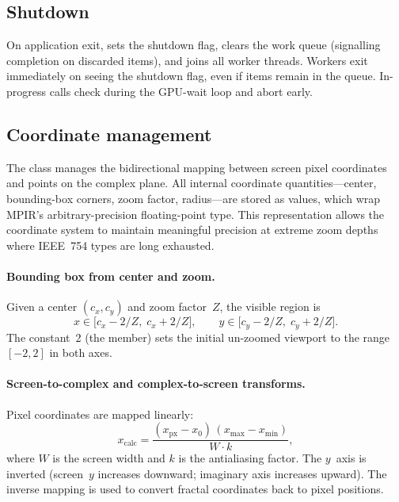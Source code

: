 \subsection{Shutdown}

On application exit,  sets the shutdown flag,
clears the work queue (signalling completion on discarded items), and joins all
worker threads.  Workers exit immediately on seeing the shutdown flag, even if
items remain in the queue.  In-progress  calls check
 during the GPU-wait loop and abort early.

\subsection{Coordinate management}
\label{subsec:coordinates}

The  class manages the bidirectional
mapping between screen pixel coordinates and points on the complex
plane.  All internal coordinate quantities---center, bounding-box
corners, zoom factor, radius---are stored as 
values, which wrap MPIR's  arbitrary-precision
floating-point type.  This representation allows the coordinate system to maintain
meaningful precision at extreme zoom depths where IEEE~754 types are
long exhausted.

\paragraph{Bounding box from center and zoom.}
Given a center $(c_x, c_y)$ and zoom factor~$Z$, the visible region
is
\[
  x \in \bigl[c_x - 2/Z,\; c_x + 2/Z\bigr],\qquad
  y \in \bigl[c_y - 2/Z,\; c_y + 2/Z\bigr].
\]
The constant~2 (the  member) sets the initial
un-zoomed viewport to the range $[-2,2]$ in both axes.

\paragraph{Screen-to-complex and complex-to-screen transforms.}
Pixel coordinates are mapped linearly:
\[
  x_{\text{calc}} = \frac{(x_{\text{px}} - x_0)\,(x_{\max}-x_{\min})}
                         {W \cdot k},
\]
where $W$ is the screen width and $k$ is the antialiasing factor.
The $y$~axis is inverted (screen~$y$ increases downward; imaginary
axis increases upward).  The inverse mapping is used to convert
fractal coordinates back to pixel positions.

